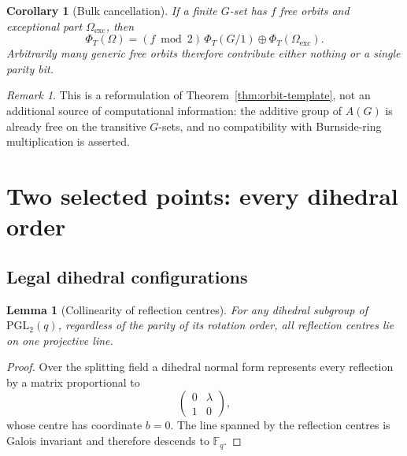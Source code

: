 \documentclass[11pt]{article}
\newtheorem{corollary}[theorem]{Corollary}
\newtheorem{lemma}[theorem]{Lemma}
\theoremstyle{definition}
\theoremstyle{remark}
\newtheorem{remark}[theorem]{Remark}
\newcommand{\PGL}{\mathrm{PGL}}
\newcommand{\F}{\mathbb{F}}
\newif\ifdraftnotes
\newcommand{\phasenote}[2]{%
  \ifdraftnotes
    \par\smallskip\noindent
    \fbox{\parbox{0.96\linewidth}{\footnotesize\textbf{[#1 owed]}\ #2}}%
    \par\smallskip
  \fi}
\begin{document}
\begin{corollary}[Bulk cancellation]
\label{cor:bulk}
If a finite $G$-set has $f$ free orbits and exceptional part $\Omega_{\mathrm{exc}}$, then
\begin{equation}
  \Phi_T(\Omega)=(f\bmod 2)\,\Phi_T(G/1)\oplus\Phi_T(\Omega_{\mathrm{exc}}).
  \label{eq:bulk}
\end{equation}
Arbitrarily many generic free orbits therefore contribute either nothing or a single parity bit.
\end{corollary}

\begin{remark}
\label{rem:burnside-scope}
This is a reformulation of Theorem~\ref{thm:orbit-template}, not an additional source of
computational information: the additive group of $A(G)$ is already free on the transitive $G$-sets,
and no compatibility with Burnside-ring multiplication is asserted.
\end{remark}

\phasenote{C308}{Proposition~\ref{prop:burnside} and Corollary~\ref{cor:bulk} are the
Lean-anchored results of this section (C262, \texttt{Burnside.lean}). C308 attaches the formal
anchor citation to the corollary, per Fable's answer~(3).}

\section{Two selected points: every dihedral order}
\label{sec:pairs}

\subsection{Legal dihedral configurations}
\label{subsec:legal}

\begin{lemma}[Collinearity of reflection centres]
\label{lem:collinear}
For any dihedral subgroup of $\PGL_2(q)$, regardless of the parity of its rotation order, all
reflection centres lie on one projective line.
\end{lemma}

\begin{proof}
Over the splitting field a dihedral normal form represents every reflection by a matrix proportional
to
\[
  \begin{pmatrix} 0&\lambda\\ 1&0\end{pmatrix},
\]
whose centre has coordinate $b=0$. The line spanned by the reflection centres is Galois invariant
and therefore descends to $\F_q$.
\end{proof}
\end{document}
